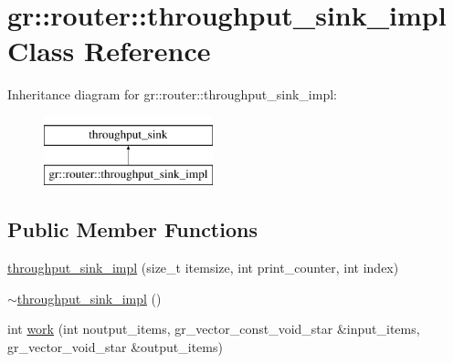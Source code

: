 \hypertarget{classgr_1_1router_1_1throughput__sink__impl}{\section{gr\+:\+:router\+:\+:throughput\+\_\+sink\+\_\+impl Class Reference}
\label{classgr_1_1router_1_1throughput__sink__impl}
}
Inheritance diagram for gr\+:\+:router\+:\+:throughput\+\_\+sink\+\_\+impl\+:\begin{figure}[H]
\begin{center}
\leavevmode
\includegraphics[height=2.000000cm]{classgr_1_1router_1_1throughput__sink__impl}
\end{center}
\end{figure}
\subsection*{Public Member Functions}
\begin{DoxyCompactItemize}
\item 
\hyperlink{classgr_1_1router_1_1throughput__sink__impl_a8e9ff88368998958c08b3333ffd37f22}{throughput\+\_\+sink\+\_\+impl} (size\+\_\+t itemsize, int print\+\_\+counter, int index)
\item 
\hyperlink{classgr_1_1router_1_1throughput__sink__impl_a017767ebc428bfece5be62f74b6ca203}{$\sim$throughput\+\_\+sink\+\_\+impl} ()
\item 
int \hyperlink{classgr_1_1router_1_1throughput__sink__impl_aec208c69fd29cd4ab20334bf373bf7e6}{work} (int noutput\+\_\+items, gr\+\_\+vector\+\_\+const\+\_\+void\+\_\+star \&input\+\_\+items, gr\+\_\+vector\+\_\+void\+\_\+star \&output\+\_\+items)
\end{DoxyCompactItemize}


